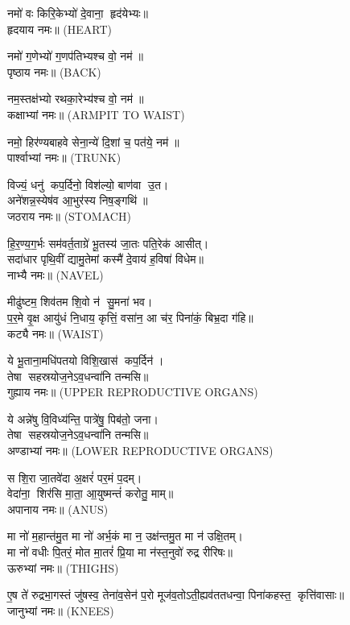 नमो॑ वः किरि॒केभ्यो॑ दे॒वाना॒ हृद॑येभ्यः॥\\
हृदयाय नमः॥ {\scriptsize (HEART)}

नमो॑ ग॒णेभ्यो॑ ग॒णप॑तिभ्यश्च वो॒ नम॑॥\\
पृष्ठाय नमः॥ {\scriptsize (BACK)}

नम॒स्तक्ष॑भ्यो रथका॒रेभ्य॑श्च वो॒ नम॑॥\\
कक्षाभ्यां नमः॥ {\scriptsize (ARMPIT TO WAIST)}

नमो॒ हिर॑ण्यबाहवे सेना॒न्ये॑ दि॒शां च॒ पत॑ये॒ नम॑॥\\
पार्श्वाभ्यां नमः॥ {\scriptsize (TRUNK)}

 विज्यं॒ धनु॑ कप॒र्दिनो॒ विश॑ल्यो॒ बाण॑वा उ॒त।\\
 अने॑शन्न॒स्येष॑व आ॒भुर॑स्य निष॒ङ्गथि॑॥\\
जठराय नमः॥ {\scriptsize (STOMACH)}


हि॒र॒ण्य॒ग॒र्भः सम॑वर्त॒ताग्रे॑ भू॒तस्य॑ जा॒तः पति॒रेक॑ आसीत्।\\
सदा॑धार पृथि॒वीं द्यामु॒तेमां कस्मै॑ दे॒वाय॑ ह॒विषा॑ विधेम॥\\
नाभ्यै नमः॥ {\scriptsize (NAVEL)}

मीढु॑ष्टम॒ शिव॑तम शि॒वो न॑ सु॒मना॑ भव।\\
 प॒र॒मे वृ॒क्ष आयु॑धं नि॒धाय॒ कृत्तिं॒ वसा॑न॒ आ च॑र॒ पिना॑कं॒ बिभ्र॒दा ग॑हि॥\\
कट्यै नमः॥ {\scriptsize (WAIST)}

 ये भू॒ताना॒मधि॑पतयो विशि॒खास॑ कप॒र्दिन॑। \\
तेषा सहस्रयोज॒नेऽव॒धन्वा॑नि तन्मसि॥ \\
गुह्याय नमः॥ {\scriptsize (UPPER REPRODUCTIVE ORGANS)}

ये अन्ने॑षु वि॒विध्य॑न्ति॒ पात्रे॑षु॒ पिब॑तो॒ जना\sn{}।\\
तेषा सहस्रयोज॒नेऽव॒धन्वा॑नि तन्मसि॥ \\
अण्डाभ्यां नमः॥ {\scriptsize (LOWER REPRODUCTIVE ORGANS)}

स शि॒रा जा॒तवे॑दा अ॒क्षरं॑ पर॒मं प॒दम्।\\
वेदा॑ना॒ शिर॑सि मा॒ता॒ आ॒युष्मन्तं॑ करोतु॒ माम्॥\\
अपानाय नमः॥ {\scriptsize (ANUS)}

मा नो॑ म॒हान्त॑मु॒त मा नो॑ अर्भ॒कं मा न॒ उक्ष॑न्तमु॒त मा न॑ उक्षि॒तम्।\\
 मा नो॑ वधीः पि॒तरं॒ मोत मा॒तरं॑ प्रि॒या मा न॑स्त॒नुवो॑ रुद्र रीरिषः॥\\
ऊरुभ्यां नमः॥ {\scriptsize (THIGHS)}

ए॒ष ते॑ रुद्रभा॒गस्तं जु॑षस्व॒ तेना॑व॒सेन॑ प॒रो मूज॑व॒तोऽती॒\-ह्यव॑ततधन्वा॒ पिना॑कहस्त॒ कृत्ति॑वासाः॥\\
जानुभ्यां नमः॥ {\scriptsize (KNEES)}

